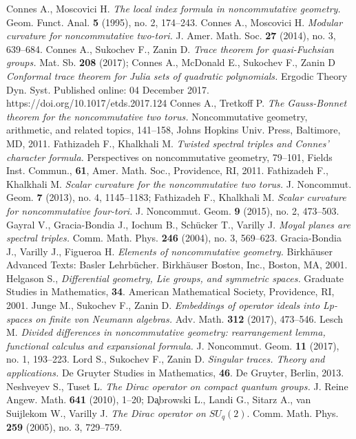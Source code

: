 \documentclass{article}
\begin{document}
\begin{thebibliography}{99}
 Connes A., Moscovici H. {\it The local index formula in noncommutative geometry.} Geom. Funct. Anal. {\bf 5} (1995), no. 2, 174--243.
 Connes A., Moscovici H. {\it Modular curvature for noncommutative two-tori.} J. Amer. Math. Soc. {\bf 27} (2014), no. 3, 639--684.
 Connes A., Sukochev F., Zanin D. {\it Trace theorem for quasi-Fuchsian groups.} Mat. Sb. {\bf 208} (2017); Connes A., McDonald E., Sukochev F., Zanin D {\it Conformal trace theorem for Julia sets of quadratic polynomials.} Ergodic Theory Dyn. Syst. Published online: 04 December 2017. https://doi.org/10.1017/etds.2017.124
 Connes A., Tretkoff P. {\it The Gauss-Bonnet theorem for the noncommutative two torus.} Noncommutative geometry, arithmetic, and related topics, 141--158, Johns Hopkins Univ. Press, Baltimore, MD, 2011.
 Fathizadeh F., Khalkhali M. {\it Twisted spectral triples and Connes' character formula.} Perspectives on noncommutative geometry, 79--101, Fields Inst. Commun., {\bf 61}, Amer. Math. Soc., Providence, RI, 2011.
 Fathizadeh F., Khalkhali M. {\it Scalar curvature for the noncommutative two torus.} J. Noncommut. Geom. {\bf 7} (2013), no. 4, 1145--1183; Fathizadeh F., Khalkhali M. {\it Scalar curvature for noncommutative four-tori.} J. Noncommut. Geom. {\bf 9} (2015), no. 2, 473--503.
 Gayral V., Gracia-Bondia J., Iochum B., Sch\"ucker T., Varilly J. {\it Moyal planes are spectral triples.} Comm. Math. Phys. {\bf 246} (2004), no. 3, 569--623.
 Gracia-Bondia J., Varilly J., Figueroa H. {\it Elements of noncommutative geometry.} Birkh\"auser Advanced Texts: Basler Lehrb\"ucher. Birkh\"auser Boston, Inc., Boston, MA, 2001.
 Helgason S., {\it Differential geometry, Lie groups, and symmetric spaces.} Graduate Studies in Mathematics, {\bf 34}. American Mathematical Society, Providence, RI, 2001.
 Junge M., Sukochev F., Zanin D. {\it Embeddings of operator ideals into Lp-spaces on finite von Neumann algebras.} Adv. Math. {\bf 312} (2017), 473--546.
 Lesch M. {\it Divided differences in noncommutative geometry: rearrangement lemma, functional calculus and expansional formula.} J. Noncommut. Geom. {\bf 11} (2017), no. 1, 193--223.
 Lord S., Sukochev F., Zanin D. {\it Singular traces. Theory and applications.} De Gruyter Studies in Mathematics, {\bf 46}. De Gruyter, Berlin, 2013.
 Neshveyev S., Tuset L. {\it The Dirac operator on compact quantum groups.} J. Reine Angew. Math. {\bf 641} (2010), 1--20; Da̧browski L., Landi G., Sitarz A., van Suijlekom W., Varilly J. {\it The Dirac operator on $SU_q(2).$} Comm. Math. Phys. {\bf 259} (2005), no. 3, 729--759.

\end{thebibliography}
\end{document}
